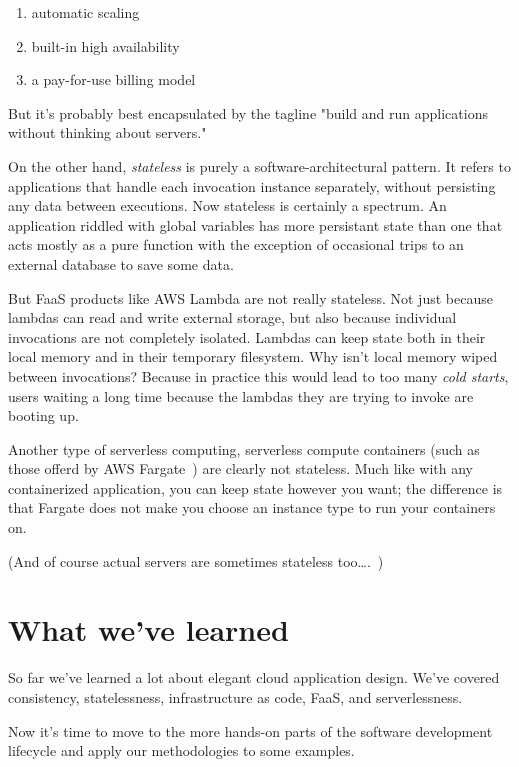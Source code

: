 \documentclass{article}
\newcommand{\noterm}[1]{\textit{#1}}
\newcommand{\term}[1]{\noterm{#1}\index{#1}}
\begin{document}
\begin{enumerate}
    \item automatic scaling
    \item built-in high availability
    \item a pay-for-use billing model
\end{enumerate}

But it's probably best encapsulated by the tagline "build and run applications without thinking about servers."

On the other hand, \term{stateless} is purely a software-architectural pattern.
It refers to applications that handle each invocation instance separately, without persisting any data between executions.
Now stateless is certainly a spectrum.
An application riddled with global variables has more persistant state than one that acts mostly as a pure function with the exception of occasional trips to an external database to save some data.

But FaaS products like AWS Lambda are not really stateless.
Not just because lambdas can read and write external storage, but also because individual invocations are not completely isolated.
Lambdas can keep state both in their local memory and in their temporary filesystem.
Why isn't local memory wiped between invocations?
Because in practice this would lead to too many \term{cold starts}, users waiting a long time because the lambdas they are trying to invoke are booting up.

Another type of serverless computing, serverless compute containers (such as those offerd by AWS Fargate~\cite{fargate}) are clearly not stateless.
Much like with any containerized application, you can keep state however you want; the difference is that Fargate does not make you choose an instance type to run your containers on.

(And of course actual servers are sometimes stateless too\ldots.~\cite{xkcd-1})

\section{What we've learned}

So far we've learned a lot about elegant cloud application design.
We've covered consistency, statelessness, infrastructure as code, FaaS, and serverlessness.

Now it's time to move to the more hands-on parts of the software development lifecycle and apply our methodologies to some examples.
\end{document}
